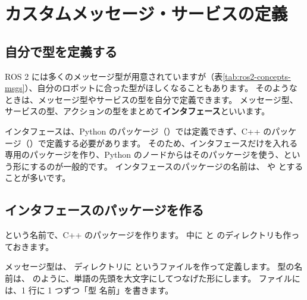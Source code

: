 \section{カスタムメッセージ・サービスの定義}
\label{sec:rclpy-interfaces}

\subsection{自分で型を定義する}

ROS 2 には多くのメッセージ型が用意されていますが（表\ref{tab:ros2-concepts-msgs}）、自分のロボットに合った型がほしくなることもあります。
そのようなときは、メッセージ型やサービスの型を自分で定義できます。
メッセージ型、サービスの型、アクションの型をまとめて\textbf{インタフェース}といいます。

\begin{caution}[インタフェースは専用のパッケージに]
  インタフェースは、Python のパッケージ（）では定義できず、C++ のパッケージ（）で定義する必要があります。
  そのため、インタフェースだけを入れる専用のパッケージを作り、Python のノードからはそのパッケージを使う、という形にするのが一般的です。
  インタフェースのパッケージの名前は、 や  とすることが多いです。
\end{caution}

\subsection{インタフェースのパッケージを作る}

 という名前で、C++ のパッケージを作ります。
中に  と  のディレクトリも作っておきます。


メッセージ型は、 ディレクトリに  というファイルを作って定義します。
型の名前は、 のように、単語の先頭を大文字にしてつなげた形にします。
ファイルには、1 行に 1 つずつ「型 名前」を書きます。


